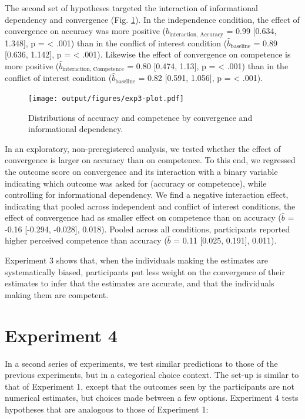 \documentclass[
  doc,floatsintext]{apa6}
\begin{document}
The second set of hypotheses targeted the interaction of informational dependency and convergence (Fig. \ref{fig:exp3-plot}). In the independence condition, the effect of convergence on accuracy was more positive (\(\hat{b}_{\text{interaction, Accuracy}}\) = 0.99 {[}0.634, 1.348{]}, p = \textless{} .001) than in the conflict of interest condition (\(\hat{b}_{\text{baseline}}\) = 0.89 {[}0.636, 1.142{]}, p = \textless{} .001). Likewise the effect of convergence on competence is more positive (\(\hat{b}_{\text{interaction, Competence}}\) = 0.80 {[}0.474, 1.13{]}, p = \textless{} .001) than in the conflict of interest condition (\(\hat{b}_{\text{baseline}}\) = 0.82 {[}0.591, 1.056{]}, p = \textless{} .001).



\begin{figure}
\centering
\texttt{[image: output/figures/exp3-plot.pdf]}
\caption{\label{fig:exp3-plot}Distributions of accuracy and competence by convergence and informational dependency.}
\end{figure}

In an exploratory, non-preregistered analysis, we tested whether the effect of convergence is larger on accuracy than on competence. To this end, we regressed the outcome score on convergence and its interaction with a binary variable indicating which outcome was asked for (accuracy or competence), while controlling for informational dependency. We find a negative interaction effect, indicating that pooled across independent and conflict of interest conditions, the effect of convergence had as smaller effect on competence than on accuracy (\(\hat{b}\) = -0.16 {[}-0.294, -0.028{]}, 0.018). Pooled across all conditions, participants reported higher perceived competence than accuracy (\(\hat{b}\) = 0.11 {[}0.025, 0.191{]}, 0.011).

Experiment 3 shows that, when the individuals making the estimates are systematically biased, participants put less weight on the convergence of their estimates to infer that the estimates are accurate, and that the individuals making them are competent.

\section{Experiment 4}\label{experiment-4}

In a second series of experiments, we test similar predictions to those of the previous experiments, but in a categorical choice context. The set-up is similar to that of Experiment 1, except that the outcomes seen by the participants are not numerical estimates, but choices made between a few options. Experiment 4 tests hypotheses that are analogous to those of Experiment 1:
\end{document}
